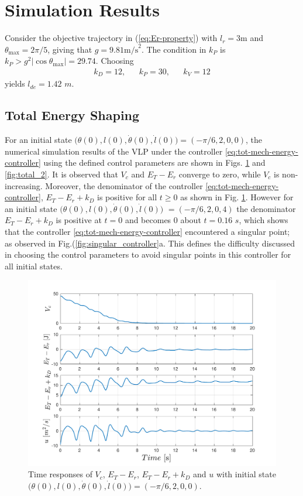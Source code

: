 \documentclass[main.tex]{subfiles}
\begin{document}
\section{Simulation Results}
\label{sec:simulation-results}
Consider the objective trajectory in (\ref{eq:Er-property}) with $l_r = 3\text{m}$ and $\theta_{\max} = 2\pi/5$, giving that $g = 9.81\text{m/s}^2$. The condition in $k_P$ is $k_P > g^2|\cos{\theta_{\max}}| = 29.74$. Choosing 
\begin{equation} \label{eq:control-parameters}
\begin{aligned}
    k_D = 12, && k_P = 30, && k_V = 12
\end{aligned}
\end{equation}
yields $l_{de} = 1.42$ $m$.
\subsection{Total Energy Shaping}
For an initial state $\big(\theta(0),l(0),\dot{\theta}(0),\dot{l}(0)\big) = (-\pi/6,2,0,0)$, 
the numerical simulation results of the VLP under the controller \eqref{eq:tot-mech-energy-controller} using the defined control parameters are shown in Figs. \ref{fig:total_1} and \ref{fig:total_2}. It is observed that $V_c$ and $E_T-E_r$ converge to zero, while $V_c$ is non-increasing. Moreover, the denominator of the controller \eqref{eq:tot-mech-energy-controller}, $E_T-E_r+k_D$ is positive for all $t\geq 0$ as shown in Fig. \ref{fig:total_1}. However for an initial state $\big(\theta(0),l(0),\dot{\theta}(0),\dot{l}(0)\big)$ $= (-\pi/6,2,0,4)$ the denominator $E_T-E_r+k_D$ is positive at $t=0$ and becomes $0$ about $t = 0.16$ $s$, which shows that the controller \eqref{eq:tot-mech-energy-controller} encountered a singular point; as observed in Fig.(\ref{fig:singular_controller}a. This defines the difficulty discussed in choosing the control parameters to avoid singular points in this controller for all initial states.
\begin{figure}[H]
    \centering
    \includegraphics[scale = 0.6]{figures/Total_Energy_Shaping/total_1b.pdf}
    \caption{Time responses of $V_c$, $E_T-E_r$, $E_T-E_r+k_D$
    and $u$ with initial state $\big(\theta(0),l(0),\dot{\theta}(0),\dot{l}(0)\big) = (-\pi/6,2,0,0)$.}
    \label{fig:total_1}
\end{figure}
\end{document}
